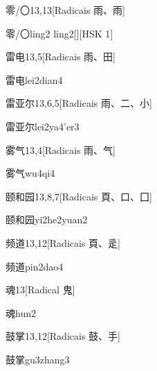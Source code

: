 \begin{entry}{零/〇}{13,13}[Radicais ⾬、⾬]
  \begin{phonetics}{零/〇}{ling2 ling2}[][HSK 1]
  \end{phonetics}
\end{entry}

\begin{entry}{雷电}{13,5}[Radicais ⾬、⽥]
  \begin{phonetics}{雷电}{lei2dian4}
  \end{phonetics}
\end{entry}

\begin{entry}{雷亚尔}{13,6,5}[Radicais ⾬、⼆、⼩]
  \begin{phonetics}{雷亚尔}{lei2ya4'er3}
  \end{phonetics}
\end{entry}

\begin{entry}{雾气}{13,4}[Radicais ⾬、⽓]
  \begin{phonetics}{雾气}{wu4qi4}
  \end{phonetics}
\end{entry}

\begin{entry}{颐和园}{13,8,7}[Radicais ⾴、⼝、⼞]
  \begin{phonetics}{颐和园}{yi2he2yuan2}
  \end{phonetics}
\end{entry}

\begin{entry}{频道}{13,12}[Radicais ⾴、⾡]
  \begin{phonetics}{频道}{pin2dao4}
  \end{phonetics}
\end{entry}

\begin{entry}{魂}{13}[Radical ⿁]
  \begin{phonetics}{魂}{hun2}
  \end{phonetics}
\end{entry}

\begin{entry}{鼓掌}{13,12}[Radicais ⿎、⼿]
  \begin{phonetics}{鼓掌}{gu3zhang3}
  \end{phonetics}
\end{entry}


